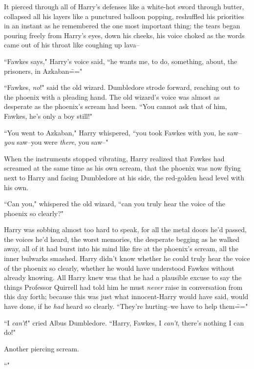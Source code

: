 It pierced through all of Harry's defenses like a white-hot sword through butter, collapsed all his layers like a punctured balloon popping, reshuffled his priorities in an instant as he remembered the one most important thing; the tears began pouring freely from Harry's eyes, down his cheeks, his voice choked as the words came out of his throat like coughing up lava\---

``Fawkes says," Harry's voice said, ``he wants me, to do, something, about, the prisoners, in Azkaban\==="

``Fawkes, \emph{no}!" said the old wizard. Dumbledore strode forward, reaching out to the phoenix with a pleading hand. The old wizard's voice was almost as desperate as the phoenix's scream had been. ``You cannot ask that of him, Fawkes, he's only a boy still!"

``You went to Azkaban," Harry whispered, ``you took Fawkes with you, he saw\---\emph{you} saw\---you were \emph{there}, you saw\---"

When the instruments stopped vibrating, Harry realized that Fawkes had screamed at the same time as his own scream, that the phoenix was now flying next to Harry and facing Dumbledore at his side, the red-golden head level with his own.

``Can you," whispered the old wizard, ``can you truly hear the voice of the phoenix so clearly?"

Harry was sobbing almost too hard to speak, for all the metal doors he'd passed, the voices he'd heard, the worst memories, the desperate begging as he walked away, all of it had burst into his mind like fire at the phoenix's scream, all the inner bulwarks smashed. Harry didn't know whether he could truly hear the voice of the phoenix so clearly, whether he would have understood Fawkes without already knowing. All Harry knew was that he had a plausible excuse to say the things Professor Quirrell had told him he must \emph{never} raise in conversation from this day forth; because this was just what innocent-Harry would have said, would have done, if he \emph{had} heard so clearly. ``They're hurting\---we have to help them\==="

``I \emph{can't}!" cried Albus Dumbledore. ``Harry, Fawkes, I \emph{can't}, there's nothing I can do!"

Another piercing scream.

``"

